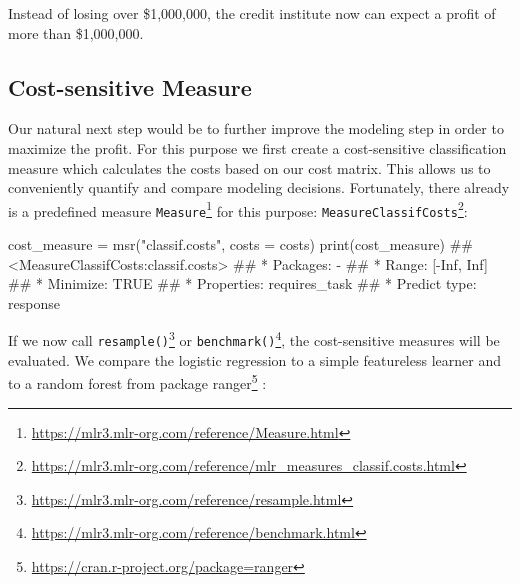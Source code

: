 \documentclass[12pt,]{scrbook}
\newenvironment{Shaded}{}{}
\newcommand{\DataTypeTok}[1]{#1}
\newcommand{\KeywordTok}[1]{\textcolor[rgb]{0.00,0.00,1.00}{#1}}
\newcommand{\NormalTok}[1]{#1}
\newcommand{\StringTok}[1]{\textcolor[rgb]{0.00,0.50,0.50}{#1}}
\renewcommand{\href}[2]{#2\footnote{\url{#1}}}
\begin{document}
Instead of losing over \$1,000,000, the credit institute now can expect a profit of more than \$1,000,000.

\hypertarget{cost-sensitive-measure}{%
\subsection{Cost-sensitive Measure}\label{cost-sensitive-measure}}

Our natural next step would be to further improve the modeling step in order to maximize the profit.
For this purpose we first create a cost-sensitive classification measure which calculates the costs based on our cost matrix.
This allows us to conveniently quantify and compare modeling decisions.
Fortunately, there already is a predefined measure \href{https://mlr3.mlr-org.com/reference/Measure.html}{\texttt{Measure}} for this purpose: \href{https://mlr3.mlr-org.com/reference/mlr_measures_classif.costs.html}{\texttt{MeasureClassifCosts}}:

\begin{Shaded}
\begin{Highlighting}[]
\NormalTok{cost_measure =}\StringTok{ }\KeywordTok{msr}\NormalTok{(}\StringTok{"classif.costs"}\NormalTok{, }\DataTypeTok{costs =}\NormalTok{ costs)}
\KeywordTok{print}\NormalTok{(cost_measure)}
\NormalTok{## <MeasureClassifCosts:classif.costs>}
\NormalTok{## * Packages: -}
\NormalTok{## * Range: [-Inf, Inf]}
\NormalTok{## * Minimize: TRUE}
\NormalTok{## * Properties: requires_task}
\NormalTok{## * Predict type: response}
\end{Highlighting}
\end{Shaded}

If we now call \href{https://mlr3.mlr-org.com/reference/resample.html}{\texttt{resample()}} or \href{https://mlr3.mlr-org.com/reference/benchmark.html}{\texttt{benchmark()}}, the cost-sensitive measures will be evaluated.
We compare the logistic regression to a simple featureless learner and to a random forest from package \href{https://cran.r-project.org/package=ranger}{ranger} :
\end{document}
